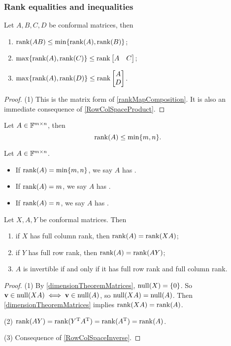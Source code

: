\subsubsection{Rank equalities and inequalities}
\begin{proposition} \label{rankMultiplication}
Let $A,B,C,D$ be conformal matrices, then
\begin{enumerate}
\item $\operatorname{rank}(AB) \leq \min\{\operatorname{rank}(A),\operatorname{rank}(B)\}$;
\item $\max\{\operatorname{rank}(A),\operatorname{rank}(C)\} \leq \operatorname{rank} \begin{bmatrix}
A & C
\end{bmatrix}$;
\item $\max\{\operatorname{rank}(A),\operatorname{rank}(D)\} \leq \operatorname{rank} \begin{bmatrix}
A \\ D
\end{bmatrix}$.
\end{enumerate}
\end{proposition}
\begin{proof}
(1) This is the matrix form of \ref{rankMapComposition}. It is also an immediate consequence of \ref{RowColSpaceProduct}.
\end{proof}

\begin{lemma}
Let $A\in\mathbb{F}^{m\times n}$, then
\[ \operatorname{rank}(A) \leq \min\{m,n\}. \]
\end{lemma}
\begin{definition}
Let $A\in\mathbb{F}^{m\times n}$.
\begin{itemize}
\item If $\operatorname{rank}(A) = \min\{m,n\}$, we say $A$ has .
\item If $\operatorname{rank}(A) = m$, we say $A$ has .
\item If $\operatorname{rank}(A) = n$, we say $A$ has .
\end{itemize}
\end{definition}

\begin{lemma}
Let $X,A,Y$ be conformal matrices. Then
\begin{enumerate}
\item if $X$ has full column rank, then $\operatorname{rank}(A) = \operatorname{rank}(XA)$;
\item if $Y$ has full row rank, then $\operatorname{rank}(A) = \operatorname{rank}(AY)$;
\item $A$ is invertible \textup{if and only if} it has full row rank and full column rank.
\end{enumerate}
\end{lemma}
\begin{proof}
(1) By \ref{dimensionTheoremMatrices}, $\operatorname{null}(X) = \{0\}$. So $\boldsymbol{\mathrm{v}}\in\operatorname{null}(XA) \iff \boldsymbol{\mathrm{v}}\in\operatorname{null}(A)$, so $\operatorname{null}(XA) = \operatorname{null}(A)$. Then \ref{dimensionTheoremMatrices} implies $\operatorname{rank}(XA) = \operatorname{rank}(A)$.

(2) $\operatorname{rank}(AY) = \operatorname{rank}(Y^{\mathrm{T}} A^{\mathrm{T}}) = \operatorname{rank}(A^{\mathrm{T}}) = \operatorname{rank}(A)$.

(3) Consequence of \ref{RowColSpaceInverse}.
\end{proof}

